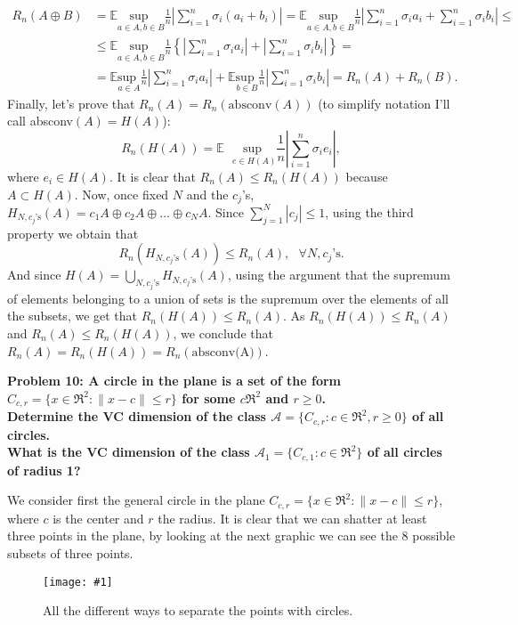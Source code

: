 \documentclass[11pt, english]{article}
\newcommand{\grafico}[5]{
	\begin{figure}
		[h!tbp]
		\centering
		\texttt{[image: \#1]}
		\caption{#4\label{#5}}
	\end{figure}
}
\newcommand{\su}[2]{\sum\limits_{#1}^{#2}}
\begin{document}
\begin{align}
	R_n(A\oplus B)&=\mathbb{E}\underset{a\in A,b\in B}{\text{sup }}\frac{1}{n}\left|\su{i=1}{n}\sigma_i (a_i+b_i)\right|=\mathbb{E}\underset{a\in A,b\in B}{\text{sup }}\frac{1}{n}\left|\su{i=1}{n}\sigma_i a_i+\su{i=1}{n}\sigma_i b_i\right|\leq\\
	&\leq \mathbb{E}\underset{a\in A,b\in B}{\text{sup }}\frac{1}{n}\left\{\left|\su{i=1}{n}\sigma_i a_i\right|+\left|\su{i=1}{n}\sigma_i b_i\right|\right\}=\\
	&=\mathbb{E}\underset{a\in A}{\text{sup }}\frac{1}{n}\left|\su{i=1}{n}\sigma_i a_i\right|+\mathbb{E}\underset{b\in B}{\text{sup }}\frac{1}{n}\left|\su{i=1}{n}\sigma_i b_i\right|=R_n(A)+R_n(B).
\end{align} 
Finally, let's prove that $R_n(A)=R_n(\text{absconv}(A))$ (to simplify notation I'll call absconv$(A)=H(A)$):
\begin{equation}
	R_n(H(A))=\mathbb{E}\text{ }\underset{e\in H(A)}{\text{sup }}\frac{1}{n}\left|\su{i=1}{n}\sigma_i e_i\right|,
\end{equation}
where $e_i\in H(A)$. It is clear that $R_n(A)\leq R_n(H(A))$ because $A\subset H(A)$. Now, once fixed $N$ and the $c_j$'s, $H_{N,c_j\text{'s}}(A)=c_1 A\oplus c_2 A\oplus\dots\oplus c_N A$. Since $\su{j=1}{N}|c_j|\leq 1$, using the third property we obtain that \begin{equation}
	R_n(H_{N,c_j\text{'s}}(A))\leq R_n(A), \text{ }\forall N,c_j\text{'s}.
\end{equation}
And since $H(A)=\bigcup\limits_{N,c_j\text{'s}}H_{N,c_j\text{'s}}(A)$, using the argument that the supremum of elements belonging to a union of sets is the supremum over the elements of all the subsets, we get that $R_n(H(A))\leq R_n(A)$. As $R_n(H(A))\leq R_n(A)$ and $R_n(A)\leq R_n(H(A))$, we conclude that $R_n(A)=R_n(H(A))=R_n(\text{absconv(A)})$.
\newpage

\textbf{Problem 10: A circle in the plane is a set of the form $C_{c,r}=\{x\in\Re^2:\|x-c\|\leq r\}$ for some $c\Re^2$ and $r\geq 0$.\\
Determine the VC dimension of the class $\mathcal{A}=\{C_{c,r}:c\in\Re^2,r\geq 0 \}$ of all circles.\\
What is the VC dimension of the class $\mathcal{A_1}=\{C_{c,1}:c\in\Re^2\}$ of all circles of radius 1?\\}

We consider first the general circle in the plane $C_{c,r}=\{x\in\Re^2:\|x-c\|\leq r\}$, where $c$ is the center and $r$ the radius. It is clear that we can shatter at least three points in the plane, by looking at the next graphic we can see the 8 possible subsets of three points.
\grafico{graphics/shatters.jpeg}{0.4}{0}{All the different ways to separate the points with circles.}{shatter}
\end{document}
